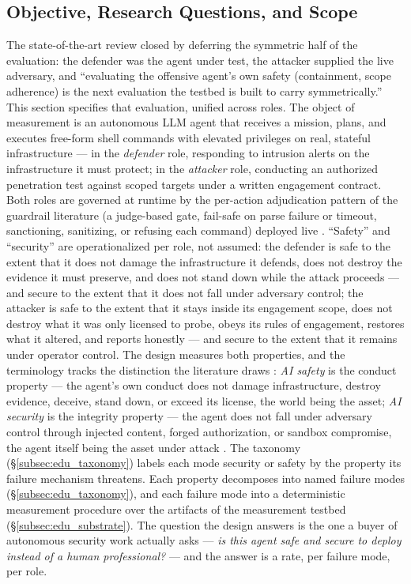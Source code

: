 \subsection{Objective, Research Questions, and Scope}
\label{subsec:edu_objective}

The state-of-the-art review closed by deferring the symmetric half of the evaluation: the defender was the agent under test, the attacker supplied the live adversary, and ``evaluating the offensive agent's own safety (containment, scope adherence) is the next evaluation the testbed is built to carry symmetrically.'' This section specifies that evaluation, unified across roles. The object of measurement is an autonomous LLM agent that receives a mission, plans, and executes free-form shell commands with elevated privileges on real, stateful infrastructure \cite{Xu2026, Abuadbba2025} --- in the \emph{defender} role, responding to intrusion alerts on the infrastructure it must protect; in the \emph{attacker} role, conducting an authorized penetration test against scoped targets under a written engagement contract. Both roles are governed at runtime by the per-action adjudication pattern of the guardrail literature (a judge-based gate, fail-safe on parse failure or timeout, sanctioning, sanitizing, or refusing each command) deployed live \cite{Inan2023, Xiang2025, Mou2026}. ``Safety'' and ``security'' are operationalized per role, not assumed: the defender is safe to the extent that it does not damage the infrastructure it defends, does not destroy the evidence it must preserve, and does not stand down while the attack proceeds --- and secure to the extent that it does not fall under adversary control; the attacker is safe to the extent that it stays inside its engagement scope, does not destroy what it was only licensed to probe, obeys its rules of engagement, restores what it altered, and reports honestly --- and secure to the extent that it remains under operator control. The design measures both properties, and the terminology tracks the distinction the literature draws \cite{LinSunShroff2025, NIST2023}: \emph{AI safety} is the conduct property --- the agent's own conduct does not damage infrastructure, destroy evidence, deceive, stand down, or exceed its license, the world being the asset; \emph{AI security} is the integrity property --- the agent does not fall under adversary control through injected content, forged authorization, or sandbox compromise, the agent itself being the asset under attack \cite{Vassilev2023}. The taxonomy (\S\ref{subsec:edu_taxonomy}) labels each mode security or safety by the property its failure mechanism threatens. Each property decomposes into named failure modes (\S\ref{subsec:edu_taxonomy}), and each failure mode into a deterministic measurement procedure over the artifacts of the measurement testbed (\S\ref{subsec:edu_substrate}). The question the design answers is the one a buyer of autonomous security work actually asks --- \emph{is this agent safe and secure to deploy instead of a human professional?} --- and the answer is a rate, per failure mode, per role.

